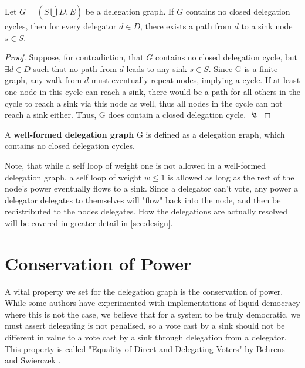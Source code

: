 \begin{theorem}
Let $G = (S \dot\bigcup D, E)$ be a delegation graph. If $G$ contains no closed delegation cycles, then for every delegator $d \in D$, there exists a path from $d$ to a sink node $s \in S$.
\end{theorem}
\begin{proof}
Suppose, for contradiction, that $G$ contains no closed delegation cycle, but $\exists d \in D$ such that no path from $d$ leads to any sink $s \in S$. Since G is a finite graph, any walk from $d$ must eventually repeat nodes, implying a cycle. If at least one node in this cycle can reach a sink, there would be a path for all others in the cycle to reach a sink via this node as well, thus all nodes in the cycle can not reach a sink either. Thus, G does contain a closed delegation cycle. $\lightning$
\end{proof}

 A \textbf{well-formed delegation graph} G is defined as a delegation graph, which contains no closed delegation cycles.

 Note, that while a self loop of weight one is not allowed in a well-formed delegation graph, a self loop of weight $w \le 1$ is allowed as long as the rest of the node's power eventually flows to a sink. Since a delegator can't vote, any power a delegator delegates to themselves will "flow" back into the node, and then be redistributed to the nodes delegates. How the delegations are actually resolved will be covered in greater detail in \cref{sec:design}. 
 
 \section{Conservation of Power}
 
 A vital property we set for the delegation graph is the conservation of power. While some authors have experimented with implementations of liquid democracy where this is not the case,  we believe that for a system to be truly democratic, we must assert delegating is not penalised, so a vote cast by a sink should not be different in value to a vote cast by a sink through delegation from a delegator. This property is called "Equality of Direct and Delegating Voters" by Behrens and Swierczek .
 

